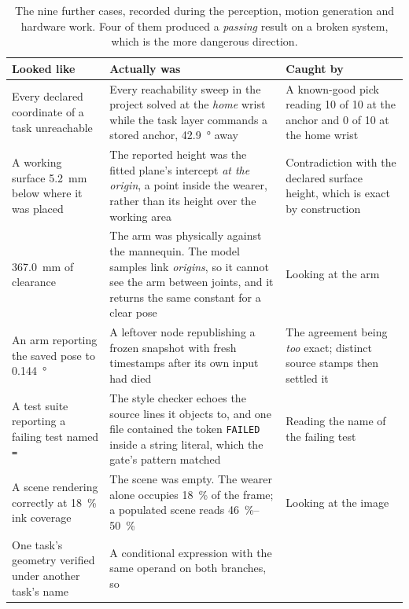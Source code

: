 \begin{table}[htbp]
  \centering
  \caption[Instrument faults, later phases]{The nine further cases, recorded
  during the perception, motion generation and hardware work. Four of them
  produced a \emph{passing} result on a broken system, which is the more
  dangerous direction.}
  \label{tab:instr2}
  \footnotesize
  \begin{tabular}{@{}p{32mm}p{45mm}p{45mm}@{}}
    \toprule
    Looked like & Actually was & Caught by \\
    \midrule
    Every declared coordinate of a task unreachable
      & Every reachability sweep in the project solved at the \emph{home}
        wrist while the task layer commands a stored anchor,
        \SI{42.9}{\degree} away
      & A known-good pick reading 10 of 10 at the anchor and 0 of 10 at the
        home wrist \\
    A working surface \SI{5.2}{\milli\metre} below where it was placed
      & The reported height was the fitted plane's intercept \emph{at the
        origin}, a point inside the wearer, rather than its height over the
        working area
      & Contradiction with the declared surface height, which is exact by
        construction \\
    \SI{367.0}{\milli\metre} of clearance
      & The arm was physically against the mannequin. The model samples link
        \emph{origins}, so it cannot see the arm between joints, and it
        returns the same constant for a clear pose
      & Looking at the arm \\
    An arm reporting the saved pose to \SI{0.144}{\degree}
      & A leftover node republishing a frozen snapshot with fresh timestamps
        after its own input had died
      & The agreement being \emph{too} exact; distinct source stamps then
        settled it \\
    A test suite reporting a failing test named \texttt{=}
      & The style checker echoes the source lines it objects to, and one file
        contained the token \texttt{FAILED} inside a string literal, which the
        gate's pattern matched
      & Reading the name of the failing test \\
    A scene rendering correctly at \SI{18}{\percent} ink coverage
      & The scene was empty. The wearer alone occupies \SI{18}{\percent} of
        the frame; a populated scene reads \SIrange{46}{50}{\percent}
      & Looking at the image \\
    One task's geometry verified under another task's name
      & A conditional expression with the same operand on both branches, so

\end{tabular}
\end{table}
